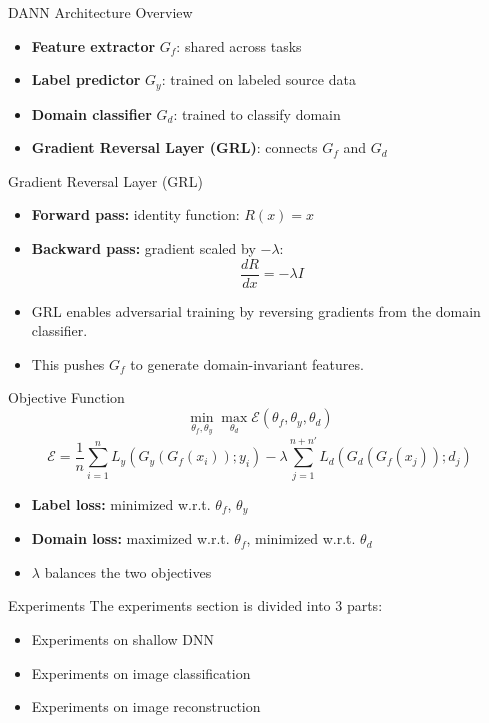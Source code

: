 \documentclass{beamer}
\begin{document}
\begin{frame}{DANN Architecture Overview}
\begin{itemize}
    \item \textbf{Feature extractor} $G_f$: shared across tasks
    \item \textbf{Label predictor} $G_y$: trained on labeled source data
    \item \textbf{Domain classifier} $G_d$: trained to classify domain
    \item \textbf{Gradient Reversal Layer (GRL)}: connects $G_f$ and $G_d$
\end{itemize}
\end{frame}

\begin{frame}{Gradient Reversal Layer (GRL)}
\begin{itemize}
    \item \textbf{Forward pass:} identity function: $R(x) = x$
    \item \textbf{Backward pass:} gradient scaled by $-\lambda$: 
    \[
    \frac{dR}{dx} = -\lambda I
    \]
    \item GRL enables adversarial training by reversing gradients from the domain classifier.
    \item This pushes $G_f$ to generate domain-invariant features.
\end{itemize}
\end{frame}

\begin{frame}{Objective Function}
\[
\min_{\theta_f, \theta_y} \max_{\theta_d} \mathcal{E}(\theta_f, \theta_y, \theta_d)
\]
\vspace{-1em}
\[
\mathcal{E} = \frac{1}{n} \sum_{i=1}^{n} L_y(G_y(G_f(x_i)); y_i) 
- \lambda \sum_{j=1}^{n+n'} L_d(G_d(G_f(x_j)); d_j)
\]
\begin{itemize}
    \item \textbf{Label loss:} minimized w.r.t. $\theta_f$, $\theta_y$
    \item \textbf{Domain loss:} maximized w.r.t. $\theta_f$, minimized w.r.t. $\theta_d$
    \item $\lambda$ balances the two objectives
\end{itemize}
\end{frame}

\begin{frame}{Experiments}
The experiments section is divided into 3 parts: 
\begin{itemize}
    \item Experiments on shallow DNN
    \item Experiments on image classification
    \item Experiments on image reconstruction
\end{itemize}
    
\end{frame}
\end{document}
